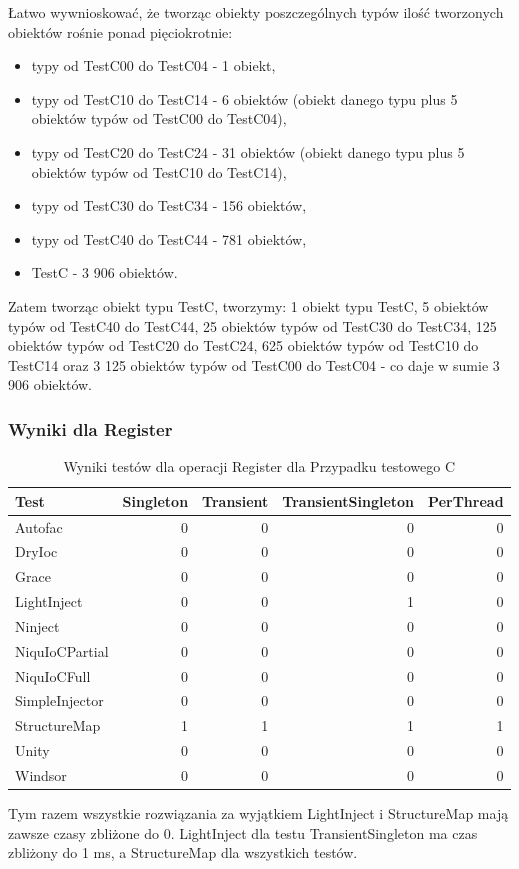 \documentclass[12pt]{article}
\begin{document}
Łatwo wywnioskować, że tworząc obiekty poszczególnych typów ilość tworzonych obiektów rośnie ponad pięciokrotnie:
\begin{itemize}
	\item typy od TestC00 do TestC04 - 1 obiekt,
	\item typy od TestC10 do TestC14 - 6 obiektów (obiekt danego typu plus 5 obiektów typów od TestC00 do TestC04),
	\item typy od TestC20 do TestC24 - 31 obiektów (obiekt danego typu plus 5 obiektów typów od TestC10 do TestC14),
	\item typy od TestC30 do TestC34 - 156 obiektów,
	\item  typy od TestC40 do TestC44 - 781 obiektów,
	\item TestC - 3 906 obiektów.
\end{itemize}
Zatem tworząc obiekt typu TestC, tworzymy: 1 obiekt typu TestC, 5 obiektów typów od TestC40 do TestC44, 25 obiektów typów od TestC30 do TestC34, 125 obiektów typów od TestC20 do TestC24, 625 obiektów typów od TestC10 do TestC14 oraz 3 125 obiektów typów od TestC00 do TestC04 - co daje w sumie 3 906 obiektów.

\subsubsection{Wyniki dla Register}
\begin{table}[H]
\captionsetup{belowskip=0pt,aboveskip=0pt}
\begin{center}
\begin{small}
	\begin{tabular}{ | l | r | r | r | r | }
    		\hline
Test & Singleton & Transient & TransientSingleton & PerThread \\ \hline
Autofac & 0 & 0 & 0 & 0 \\ \hline
DryIoc & 0 & 0 & 0 & 0 \\ \hline
Grace & 0 & 0 & 0 & 0 \\ \hline
LightInject & 0 & 0 & 1 & 0 \\ \hline
Ninject & 0 & 0 & 0 & 0 \\ \hline
NiquIoCPartial & 0 & 0 & 0 & 0 \\ \hline
NiquIoCFull & 0 & 0 & 0 & 0 \\ \hline
SimpleInjector & 0 & 0 & 0 & 0 \\ \hline
StructureMap & 1 & 1 & 1 & 1 \\ \hline
Unity & 0 & 0 & 0 & 0 \\ \hline
Windsor & 0 & 0 & 0 & 0 \\ \hline
  	\end{tabular}
\end{small}
\end{center}
\caption{Wyniki testów dla operacji Register dla Przypadku testowego C}
\label{TestCaseC_Register}
\end{table}
Tym razem wszystkie rozwiązania za wyjątkiem LightInject i StructureMap mają zawsze czasy zbliżone do 0. LightInject dla testu TransientSingleton ma czas zbliżony do 1 ms, a StructureMap dla wszystkich testów.
\end{document}
